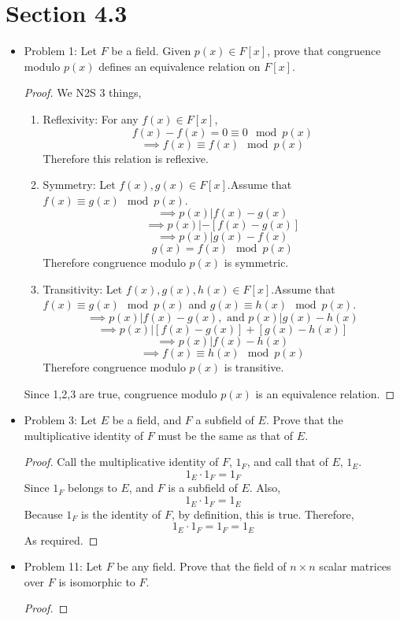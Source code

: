 \documentclass[hidelinks,12pt]{article}
\title{\scalebox{2}{Math 531 Homework 9}}
\author{\scalebox{1.5}{Theo Koss}}
\date{April 2021}
\begin{document}
\maketitle
\section{Section 4.3}
\begin{itemize}
    \item Problem 1: Let $F$ be a field. Given $p(x)\in F[x]$, prove that congruence modulo $p(x)$ defines an equivalence relation on $F[x]$.\begin{proof}We N2S 3 things,\begin{enumerate}[label=(\arabic*)]
        \item Reflexivity: For any $f(x)\in F[x]$, $$f(x)-f(x)=0\equiv0\mod{p(x)}$$ $$\implies f(x)\equiv f(x)\mod{p(x)}$$ Therefore this relation is reflexive.
        \item Symmetry: Let $f(x),g(x)\in F[x]$.\newline Assume that $f(x)\equiv g(x)\mod{p(x)}$. $$\implies p(x)|f(x)-g(x)$$ $$\implies p(x)|-[f(x)-g(x)]$$ $$\implies p(x)|g(x)-f(x)$$ $$g(x)=f(x)\mod{p(x)}$$Therefore congruence modulo $p(x)$ is symmetric.
        \item Transitivity: Let $f(x),g(x),h(x)\in F[x]$.\newline Assume that $f(x)\equiv g(x)\mod{p(x)}$ and $g(x)\equiv h(x)\mod{p(x)}$. $$\implies p(x)|f(x)-g(x), \text{ and }p(x)|g(x)-h(x)$$ $$\implies p(x)|[f(x)-g(x)]+[g(x)-h(x)]$$ $$\implies p(x)|f(x)-h(x)$$ $$\implies f(x)\equiv h(x)\mod{p(x)}$$ Therefore congruence modulo $p(x)$ is transitive.
    \end{enumerate}
    Since 1,2,3 are true, congruence modulo $p(x)$ is an equivalence relation.
    \end{proof}
    \item Problem 3: Let $E$ be a field, and $F$ a subfield of $E$. Prove that the multiplicative identity of $F$ must be the same as that of $E$.\begin{proof}
    Call the multiplicative identity of $F$, $1_F$, and call that of $E$, $1_E$. $$1_E\cdot 1_F=1_F$$ Since $1_F$ belongs to $E$, and $F$ is a subfield of $E$. Also, $$1_E\cdot 1_F=1_E$$ Because $1_F$ is the identity of $F$, by definition, this is true. Therefore, $$1_E\cdot 1_F=1_F=1_E$$As required.
    \end{proof}
    \item Problem 11: Let $F$ be any field. Prove that the field of $n\times n$ scalar matrices over $F$ is isomorphic to $F$.\begin{proof}

\end{proof}
\end{itemize}
\end{document}
